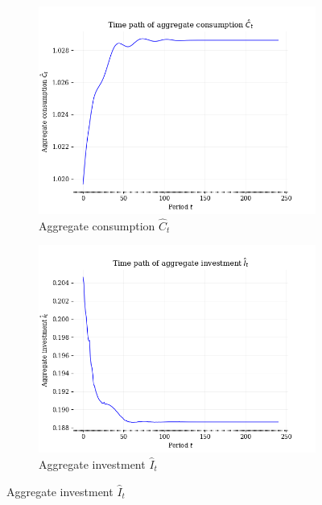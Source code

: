 \documentclass[letterpaper,12pt]{article}
\theoremstyle{definition}
\begin{document}
    \begin{figure}[htbp]\centering \captionsetup{width=5.0in}
    \caption{\label{FigTP_CINX}\textbf{Equilibrium transition paths of aggregate consumption, investment, and net exports}}
      \begin{subfigure}[b]{0.4\textwidth}
        \includegraphics[width=\textwidth]{images/TP_C_path.png}
        \caption{Aggregate consumption $\hat{C}_t$}
        \label{FigTP_CINX_C}
      \end{subfigure}
      \begin{subfigure}[b]{0.4\textwidth}
        \includegraphics[width=\textwidth]{images/TP_I_path.png}
        \caption{Aggregate investment $\hat{I}_t$}
        \label{FigTP_CINX_I}

\end{subfigure}
\end{figure}
\end{document}
